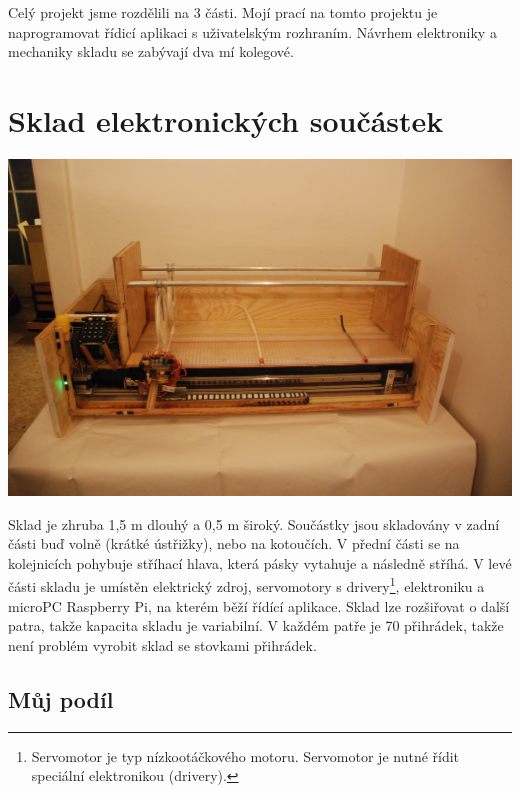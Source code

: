 \documentclass[12pt, a4paper, oneside]{article}
\begin{document}
Celý projekt jsme rozdělili na 3 části. Mojí prací na tomto projektu je naprogramovat řídicí aplikaci s uživatelským rozhraním. Návrhem elektroniky a mechaniky skladu se zabývají dva mí kolegové.


\newpage

\section{Sklad elektronických součástek}


\begin{minipage}{\textwidth}
\begin{center}
\includegraphics[scale=0.10]{img/sklad.JPG}
\\
\caption{Obr. 1: přední pohled na sklad}
\end{center}
\end{minipage}
\vspace{4mm}

Sklad je zhruba 1,5 m dlouhý a 0,5 m široký. Součástky jsou skladovány v zadní části buď volně (krátké ústřižky), nebo na kotoučích. V přední části se na kolejnicích pohybuje stříhací hlava, která pásky vytahuje a následně stříhá. V levé části skladu je umístěn elektrický zdroj, servomotory s drivery\footnote{Servomotor je typ nízkootáčkového motoru. Servomotor je nutné řídit speciální elektronikou (drivery).}, elektroniku a microPC Raspberry Pi\cite{raspi}, na kterém běží řídící aplikace. Sklad lze rozšiřovat o další patra, takže kapacita skladu je variabilní. V každém patře je 70 přihrádek, takže není problém vyrobit sklad se stovkami přihrádek.

\subsection{Můj podíl}
\end{document}
